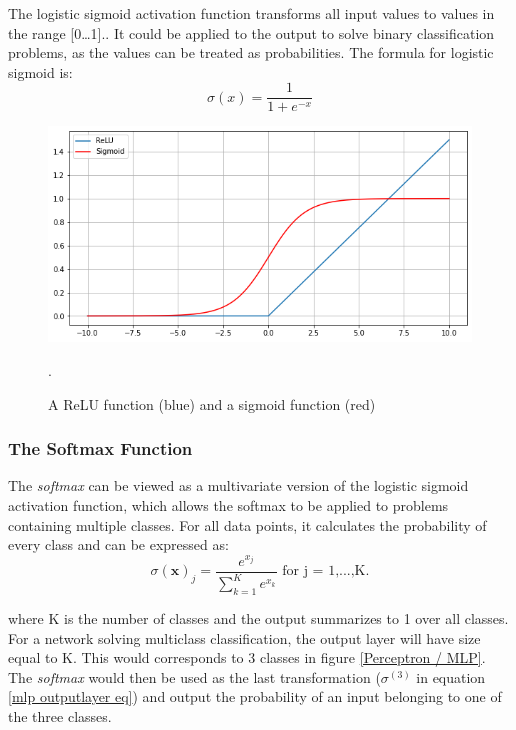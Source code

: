         The logistic sigmoid activation function transforms all input values to values in the range [0…1].\cite{sharma2019new_activation_func}. It could be applied to the output to solve binary classification problems, as the values can be treated as probabilities. The formula for logistic sigmoid is:
            \begin{equation} \label{sigmoid_eq}
                \sigma(x) = \dfrac{1}{1 + e^{-x}} 
            \end{equation}
            
            \begin{figure}[H]
                \centering
                \includegraphics[scale=0.5]{figures/activation.png}
                \caption[ReLu and sigmoid]{A ReLU function (blue) and a sigmoid function (red)}.
              	\medskip 
                \label{activation_fig}
            \end{figure}

    \subsubsection{The Softmax Function}
        The \textit{softmax} can be viewed as a multivariate version of the logistic sigmoid activation function, which allows the softmax to be applied to problems containing multiple classes\cite{sharma2019new_activation_func}. For all data points, it calculates the probability of every class and can be expressed as:
        \begin{equation}
            \sigma(\textbf{x})_{j} = \dfrac{e^{x_{j}}}{\sum^{K}_{k=1}e^{x_{k}}} \textrm{ for j = 1,...,K.}
        \end{equation}
        
        where K is the number of classes and the output summarizes to 1 over all classes. For a network solving multiclass classification, the output layer will have size equal to K. This would corresponds to 3 classes in figure \ref{Perceptron / MLP}. The \textit{softmax} would then be used as the last transformation ($\sigma^{(3)}$ in equation \ref{mlp outputlayer eq}) and output the probability of an input belonging to one of the three classes.
        
